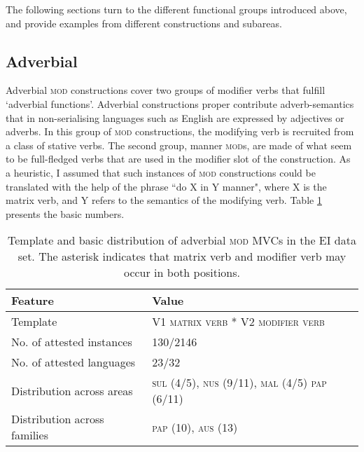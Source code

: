 The following sections turn to the different functional groups introduced above, and provide examples from different constructions and subareas.

\subsection{Adverbial}\label{sec:adverbial}

Adverbial \textsc{mod} constructions cover two groups of modifier verbs that fulfill `adverbial functions'. Adverbial constructions proper contribute adverb-semantics that in non-serialising languages such as English are expressed by adjectives or adverbs. In this group of \textsc{mod} constructions, the modifying verb is recruited from a class of stative verbs. The second group, manner \textsc{mod}s, are made of what seem to be full-fledged verbs that are used in the modifier slot of the construction. As a heuristic, I assumed that such instances of \textsc{mod} constructions could be translated with the help of the phrase ``do X in Y manner", where X is the matrix verb, and Y refers to the semantics of the modifying verb. Table \ref{table:adverbial} presents the basic numbers. 

\begin{table}


\begin{tabular}{ll}
\lsptoprule
Feature&Value\tabularnewline
\hline
Template&V1 \textsc{matrix verb} * V2 \textsc{modifier verb}\tabularnewline
No. of attested instances& 130/2146 \tabularnewline
No. of attested languages& 23/32 \tabularnewline
Distribution across areas& \textsc{sul} (4/5), \textsc{nus} (9/11), \textsc{mal} (4/5) \textsc{pap} (6/11) \tabularnewline
Distribution across families& \textsc{pap} (10), \textsc{aus} (13) \tabularnewline
\hline
\end{tabular}
\caption[Template and basic distribution of adverbial \textsc{mod} MVCs]{Template and basic distribution of adverbial \textsc{mod} MVCs in the EI data set. The asterisk indicates that matrix verb and modifier verb may occur in both positions.}
\label{table:adverbial}
\end{table}


